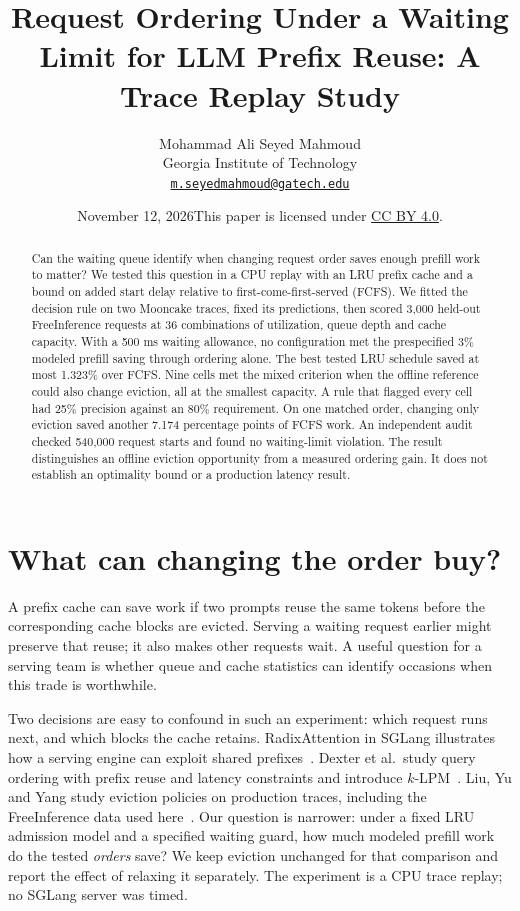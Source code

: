 \documentclass[11pt,letterpaper]{article}
\title{Request Ordering Under a Waiting Limit for LLM Prefix Reuse: A Trace Replay Study}
\author{Mohammad Ali Seyed Mahmoud\\[3pt] {\normalsize Georgia Institute of Technology}\\[-1pt] {\small\href{mailto:m.seyedmahmoud@gatech.edu}{\nolinkurl{m.seyedmahmoud@gatech.edu}}}}
\date{\small November 12, 2026\enspace\textperiodcentered\enspace This paper is licensed under \href{https://creativecommons.org/licenses/by/4.0/}{CC BY 4.0}.}
\begin{document}
\maketitle


\begin{abstract}

Can the waiting queue identify when changing request order saves enough prefill work to matter? We tested this question in a CPU replay with an LRU prefix cache and a bound on added start delay relative to first-come-first-served (FCFS). We fitted the decision rule on two Mooncake traces, fixed its predictions, then scored 3,000 held-out FreeInference requests at 36 combinations of utilization, queue depth and cache capacity. With a 500 ms waiting allowance, no configuration met the prespecified 3\% modeled prefill saving through ordering alone. The best tested LRU schedule saved at most 1.323\% over FCFS. Nine cells met the mixed criterion when the offline reference could also change eviction, all at the smallest capacity. A rule that flagged every cell had 25\% precision against an 80\% requirement. On one matched order, changing only eviction saved another 7.174 percentage points of FCFS work. An independent audit checked 540,000 request starts and found no waiting-limit violation. The result distinguishes an offline eviction opportunity from a measured ordering gain. It does not establish an optimality bound or a production latency result.

\end{abstract}

\section{What can changing the order buy?}
A prefix cache can save work if two prompts reuse the same tokens before the corresponding cache blocks are evicted. Serving a waiting request earlier might preserve that reuse; it also makes other requests wait. A useful question for a serving team is whether queue and cache statistics can identify occasions when this trade is worthwhile.

Two decisions are easy to confound in such an experiment: which request runs next, and which blocks the cache retains. RadixAttention in SGLang illustrates how a serving engine can exploit shared prefixes~\cite{sglang}. Dexter et al.\ study query ordering with prefix reuse and latency constraints and introduce \(k\)-LPM~\cite{dexter}. Liu, Yu and Yang study eviction policies on production traces, including the FreeInference data used here~\cite{fancy}. Our question is narrower: under a fixed LRU admission model and a specified waiting guard, how much modeled prefill work do the tested \emph{orders} save? We keep eviction unchanged for that comparison and report the effect of relaxing it separately. The experiment is a CPU trace replay; no SGLang server was timed.
\end{document}
